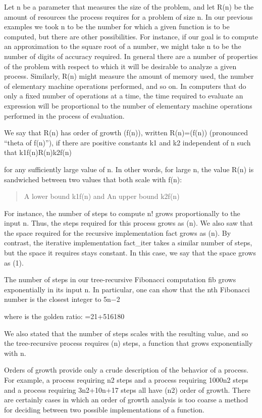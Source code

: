 \documentclass[letterpaper,10pt,dvipdfmx]{sphinxmanual}
\begin{document}
Let n be a parameter that measures the size of the problem, and let R(n) be the amount of resources the process requires for a problem of size n. In our previous examples we took n to be the number for which a given function is to be computed, but there are other possibilities. For instance, if our goal is to compute an approximation to the square root of a number, we might take n to be the number of digits of accuracy required. In general there are a number of properties of the problem with respect to which it will be desirable to analyze a given process. Similarly, R(n) might measure the amount of memory used, the number of elementary machine operations performed, and so on. In computers that do only a fixed number of operations at a time, the time required to evaluate an expression will be proportional to the number of elementary machine operations performed in the process of evaluation.

We say that R(n) has order of growth (f(n)), written R(n)=(f(n)) (pronounced ``theta of f(n)''), if there are positive constants k1 and k2 independent of n such that
k1f(n)R(n)k2f(n)

for any sufficiently large value of n. In other words, for large n, the value R(n) is sandwiched between two values that both scale with f(n):
\begin{quote}

A lower bound k1f(n) and
An upper bound k2f(n)
\end{quote}

For instance, the number of steps to compute n! grows proportionally to the input n. Thus, the steps required for this process grows as (n). We also saw that the space required for the recursive implementation fact grows as (n). By contrast, the iterative implementation fact\_iter takes a similar number of steps, but the space it requires stays constant. In this case, we say that the space grows as (1).

The number of steps in our tree-recursive Fibonacci computation fib grows exponentially in its input n. In particular, one can show that the nth Fibonacci number is the closest integer to
5n−2

where is the golden ratio:
=21+516180

We also stated that the number of steps scales with the resulting value, and so the tree-recursive process requires (n) steps, a function that grows exponentially with n.

Orders of growth provide only a crude description of the behavior of a process. For example, a process requiring n2 steps and a process requiring 1000n2 steps and a process requiring 3n2+10n+17 steps all have (n2) order of growth. There are certainly cases in which an order of growth analysis is too coarse a method for deciding between two possible implementations of a function.
\end{document}
